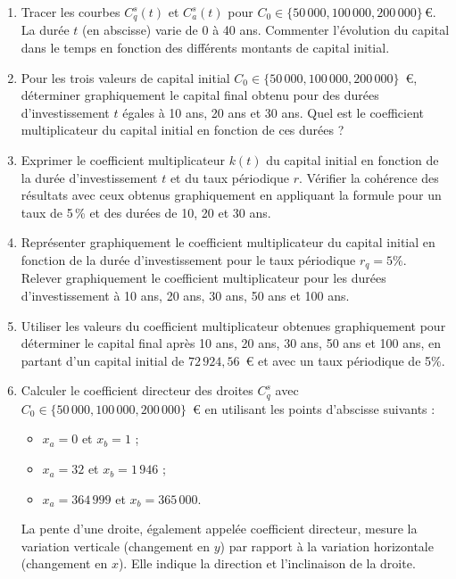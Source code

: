\documentclass{article}
\begin{document}
\begin{enumerate}[label=\textbf{Q1.\arabic*}]
    \item Tracer les courbes \( C^s_q(t) \) et \( C^s_a(t) \) pour \( C_0 \in \{50\,000, 100\,000, 200\,000\} \, \text{€} \). La durée \( t \) (en abscisse) varie de 0 à 40 ans. Commenter l'évolution du capital dans le temps en fonction des différents montants de capital initial.

    \item Pour les trois valeurs de capital initial \( C_0 \in \{50\,000, 100\,000, 200\,000\} \)~€, déterminer graphiquement le capital final obtenu pour des durées d'investissement \( t \) égales à 10 ans, 20 ans et 30 ans. Quel est le coefficient multiplicateur du capital initial en fonction de ces durées ?

    \item Exprimer le coefficient multiplicateur \( k(t) \) du capital initial en fonction de la durée d'investissement \( t \) et du taux périodique \( r \). Vérifier la cohérence des résultats avec ceux obtenus graphiquement en appliquant la formule pour un taux de 5\,\% et des durées de 10, 20 et 30 ans.

    \item Représenter graphiquement le coefficient multiplicateur du capital initial en fonction de la durée d'investissement pour le taux périodique $r_q = 5\%$. Relever graphiquement le coefficient multiplicateur pour les durées d'investissement à 10 ans, 20 ans, 30 ans, 50 ans et 100 ans.

    \item Utiliser les valeurs du coefficient multiplicateur obtenues graphiquement pour déterminer le capital final après 10 ans, 20 ans, 30 ans, 50 ans et 100 ans, en partant d'un capital initial de $72\,924,56$\ € et avec un taux périodique de 5\%.

    \item Calculer le coefficient directeur des droites \( C^s_q \) avec \( C_0 \in \{50\,000, 100\,000, 200\,000\} \)~€ en utilisant les points d'abscisse suivants :
    \begin{itemize}
        \item \( x_a = 0 \) et \( x_b = 1 \) ;
        \item \( x_a = 32 \) et \( x_b = 1\,946 \) ;
        \item \( x_a = 364\,999 \) et \( x_b = 365\,000 \).
    \end{itemize}
    \begin{tcolorbox}[
        colback=lightgreen,
        colframe=lightgreen,
        boxrule=0.5pt,
        arc=0pt,
        left=10pt,
        right=10pt,
        top=6pt,
        bottom=6pt,
        boxsep=2pt,
        before upper={\faLightbulb\hspace{10pt}}
    ]
        La pente d'une droite, également appelée coefficient directeur, mesure la variation verticale (changement en \( y \)) par rapport à la variation horizontale (changement en \( x \)). Elle indique la direction et l'inclinaison de la droite.
    

\end{tcolorbox}
\end{enumerate}
\end{document}
